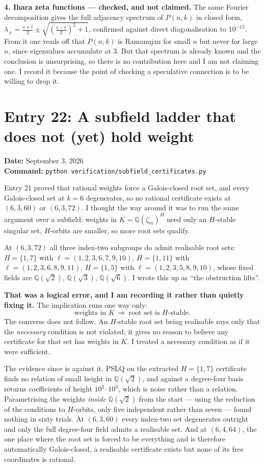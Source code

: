 \documentclass[12pt]{article}
\begin{document}
\textbf{4. Ihara zeta functions --- checked, and not claimed.} The same Fourier
decomposition gives the full adjacency spectrum of $P(n,k)$ in closed form,
$\lambda_\pm=\tfrac{s+t}{2}\pm\sqrt{(\tfrac{s-t}{2})^2+1}$, confirmed against
direct diagonalisation to $10^{-15}$. From it one reads off that $P(n,k)$ is
Ramanujan for small $n$ but never for large $n$, since eigenvalues accumulate
at $3$. But that spectrum is already known and the conclusion is unsurprising,
so there is no contribution here and I am not claiming one. I record it because
the point of checking a speculative connection is to be willing to drop it.


\clearpage
\section*{Entry 22: A subfield ladder that does not (yet) hold weight}
\textbf{Date:} September 3, 2026\\
\textbf{Command:} {\small\texttt{python verification/subfield\_certificates.py}}

Entry 21 proved that rational weights force a Galois-closed root set, and every
Galois-closed set at $k=6$ degenerates, so no rational certificate exists at
$(6,3,60)$ or $(6,3,72)$. I thought the way around it was to run the same
argument over a subfield: weights in $K=\mathbb Q(\zeta_m)^H$ need only an
$H$-stable singular set, $H$-orbits are smaller, so more root sets qualify.

At $(6,3,72)$ all three index-two subgroups do admit realisable root sets:
$H=\{1,7\}$ with $\ell=(1,2,3,6,7,9,10)$, $H=\{1,11\}$ with
$\ell=(1,2,3,6,8,9,11)$, $H=\{1,5\}$ with $\ell=(1,2,3,5,8,9,10)$, whose fixed
fields are $\mathbb Q(\sqrt2)$, $\mathbb Q(\sqrt3)$, $\mathbb Q(\sqrt6)$. I
wrote this up as ``the obstruction lifts''.

\textbf{That was a logical error, and I am recording it rather than quietly
fixing it.} The implication runs one way only:
\[
  \text{weights in } K \ \Longrightarrow\ \text{root set is } H\text{-stable}.
\]
The converse does not follow. An $H$-stable root set being realisable says only
that the \emph{necessary} condition is not violated; it gives no reason to
believe any certificate for that set has weights in $K$. I treated a necessary
condition as if it were sufficient.

The evidence since is against it. PSLQ on the extracted $H=\{1,7\}$ certificate
finds no relation of small height in $\mathbb Q(\sqrt2)$, and against a
degree-four basis returns coefficients of height $10^{2}$--$10^{3}$, which is
noise rather than a relation. Parametrising the weights \emph{inside}
$\mathbb Q(\sqrt2)$ from the start --- using the reduction of the conditions to
$H$-orbits, only five independent rather than seven --- found nothing in sixty
trials. At $(6,3,60)$ every index-two set degenerates outright and only the
full degree-four field admits a realisable set. And at $(6,4,64)$, the one
place where the root set is forced to be everything and is therefore
automatically Galois-closed, a realisable certificate exists but none of its
free coordinates is rational.
\end{document}
